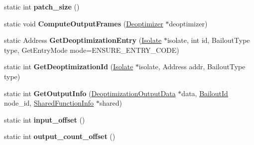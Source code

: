 \begin{DoxyCompactItemize}
\item 
static int {\bfseries patch\+\_\+size} ()\hypertarget{classv8_1_1internal_1_1_deoptimizer_a1f7f2485ba574423fed32fab44e6a15b}{}\label{classv8_1_1internal_1_1_deoptimizer_a1f7f2485ba574423fed32fab44e6a15b}

\item 
static void {\bfseries Compute\+Output\+Frames} (\hyperlink{classv8_1_1internal_1_1_deoptimizer}{Deoptimizer} $\ast$deoptimizer)\hypertarget{classv8_1_1internal_1_1_deoptimizer_a27cf077b48bd6ef6ff9905b2ebccc6c1}{}\label{classv8_1_1internal_1_1_deoptimizer_a27cf077b48bd6ef6ff9905b2ebccc6c1}

\item 
static Address {\bfseries Get\+Deoptimization\+Entry} (\hyperlink{classv8_1_1internal_1_1_isolate}{Isolate} $\ast$isolate, int id, Bailout\+Type type, Get\+Entry\+Mode mode=E\+N\+S\+U\+R\+E\+\_\+\+E\+N\+T\+R\+Y\+\_\+\+C\+O\+DE)\hypertarget{classv8_1_1internal_1_1_deoptimizer_a580a91a489454504e540524af2f6fe8b}{}\label{classv8_1_1internal_1_1_deoptimizer_a580a91a489454504e540524af2f6fe8b}

\item 
static int {\bfseries Get\+Deoptimization\+Id} (\hyperlink{classv8_1_1internal_1_1_isolate}{Isolate} $\ast$isolate, Address addr, Bailout\+Type type)\hypertarget{classv8_1_1internal_1_1_deoptimizer_aecabaf25305bc863b7ab363b184fde4d}{}\label{classv8_1_1internal_1_1_deoptimizer_aecabaf25305bc863b7ab363b184fde4d}

\item 
static int {\bfseries Get\+Output\+Info} (\hyperlink{classv8_1_1internal_1_1_deoptimization_output_data}{Deoptimization\+Output\+Data} $\ast$data, \hyperlink{classv8_1_1internal_1_1_bailout_id}{Bailout\+Id} node\+\_\+id, \hyperlink{classv8_1_1internal_1_1_shared_function_info}{Shared\+Function\+Info} $\ast$shared)\hypertarget{classv8_1_1internal_1_1_deoptimizer_aa373a2817b667cc5ed376ada3f9ce3a8}{}\label{classv8_1_1internal_1_1_deoptimizer_aa373a2817b667cc5ed376ada3f9ce3a8}

\item 
static int {\bfseries input\+\_\+offset} ()\hypertarget{classv8_1_1internal_1_1_deoptimizer_a596fc3bd6f8ae86360b9aecb5a240ce6}{}\label{classv8_1_1internal_1_1_deoptimizer_a596fc3bd6f8ae86360b9aecb5a240ce6}

\item 
static int {\bfseries output\+\_\+count\+\_\+offset} ()\hypertarget{classv8_1_1internal_1_1_deoptimizer_a76a3faf66ccb1821e439a49f206b51bf}{}\label{classv8_1_1internal_1_1_deoptimizer_a76a3faf66ccb1821e439a49f206b51bf}


\end{DoxyCompactItemize}
